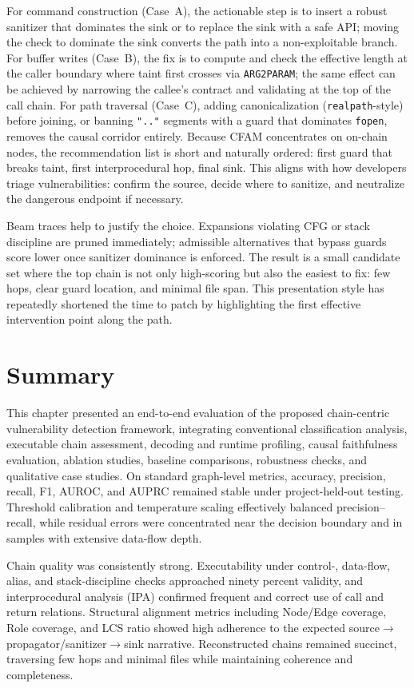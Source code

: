 \documentclass{buthesis}
\begin{document}
For command construction (Case~A), the actionable step is to insert a robust sanitizer that dominates the sink or to replace the sink with a safe API; moving the check to dominate the sink converts the path into a non-exploitable branch. For buffer writes (Case~B), the fix is to compute and check the effective length at the caller boundary where taint first crosses via \texttt{ARG2PARAM}; the same effect can be achieved by narrowing the callee’s contract and validating at the top of the call chain. For path traversal (Case~C), adding canonicalization (\texttt{realpath}-style) before joining, or banning \texttt{".."} segments with a guard that dominates \texttt{fopen}, removes the causal corridor entirely. Because CFAM concentrates on on-chain nodes, the recommendation list is short and naturally ordered: first guard that breaks taint, first interprocedural hop, final sink. This aligns with how developers triage vulnerabilities: confirm the source, decide where to sanitize, and neutralize the dangerous endpoint if necessary.

Beam traces help to justify the choice. Expansions violating CFG or stack discipline are pruned immediately; admissible alternatives that bypass guards score lower once sanitizer dominance is enforced. The result is a small candidate set where the top chain is not only high-scoring but also the easiest to fix: few hops, clear guard location, and minimal file span. This presentation style has repeatedly shortened the time to patch by highlighting the first effective intervention point along the path.


\section{Summary}

This chapter presented an end-to-end evaluation of the proposed chain-centric vulnerability detection framework, integrating conventional classification analysis, executable chain assessment, decoding and runtime profiling, causal faithfulness evaluation, ablation studies, baseline comparisons, robustness checks, and qualitative case studies. On standard graph-level metrics, accuracy, precision, recall, F1, AUROC, and AUPRC remained stable under project-held-out testing. Threshold calibration and temperature scaling effectively balanced precision–recall, while residual errors were concentrated near the decision boundary and in samples with extensive data-flow depth.

Chain quality was consistently strong. Executability under control-, data-flow, alias, and stack-discipline checks approached ninety percent validity, and interprocedural analysis (IPA) confirmed frequent and correct use of call and return relations. Structural alignment metrics including Node/Edge coverage, Role coverage, and LCS ratio showed high adherence to the expected \newline 
source$\rightarrow$propagator/sanitizer$\rightarrow$sink narrative. Reconstructed chains remained succinct, traversing few hops and minimal files while maintaining coherence and completeness.
\end{document}
